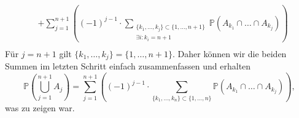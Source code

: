 \documentclass[uebung]{lecture}
\newcommand{\IP}{\mathbb{P}}
\begin{document}
\begin{aufgabe}
\begin{enumerate}[(a)]
\begin{align*}
                &+ \sum_{j = 1}^{n+1} \left((-1)^{j-1} \cdot \sum_{\substack{\{k_1, \dots, k_j\} \subset \{1,\dots, n+1\}\\\exists i\colon k_i = n+1}} \IP(A_{k_1} \cap \dots \cap A_{k_j})\right)\\
            \end{align*}
            Für $j = n+1$ gilt $\{k_1,\dots, k_j\} = \{1,\dots, n+1\}$. Daher können wir die beiden Summen im letzten Schritt einfach zusammenfassen und erhalten
            \[
                \IP\left(\bigcup_{j=1}^{n+1} A_j\right) =  \sum_{j = 1}^{n+1} \left((-1)^{j-1} \cdot \sum_{\{k_1, \dots, k_n\} \subset \{1,\dots, n\}} \IP(A_{k_1} \cap \dots \cap A_{k_j})\right),
            \]
            was zu zeigen war.

\end{enumerate}
\end{aufgabe}
\end{document}

